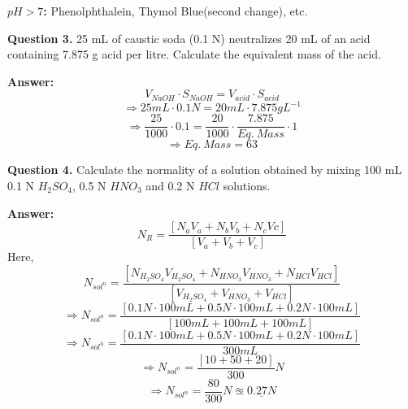 \documentclass[12pt]{article}
\begin{document}
	\textbf{$pH>7$: }Phenolphthalein, Thymol Blue(second change), etc.
	
	\pagebreak
	
	\textbf{Question 3.} 25 mL of caustic soda (0.1 N) neutralizes 20 mL of an acid containing 7.875 g acid per litre. Calculate the equivalent mass of the acid.
	
	\textbf{Answer: }\\
	$$V_{NaOH} \cdot S_{NaOH} = V_{acid} \cdot S_{acid}$$
	$$\Rightarrow 25mL \cdot 0.1N = 20mL \cdot 7.875gL^{-1}$$
	$$\Rightarrow \frac{25}{1000} \cdot 0.1 = \frac{20}{1000} \cdot \frac{7.875}{Eq.\ Mass} \cdot 1$$
	$$\Rightarrow Eq.\ Mass = 63$$
	
	\textbf{Question 4.} Calculate the normality of a solution obtained by mixing 100 mL 0.1 N $H_{2}SO_{4}$, 0.5 N $HNO_{3}$ and 0.2 N $HCl$ solutions.
	
	\textbf{Answer: }
	$$N_{R} = \frac{[N_{a}V_{a} + N_{b}V_{b} + N_{c}V{c}]}{[V_{a}+V_{b}+V_{c}]}$$
	Here,
	$$N_{sol^{\underline{n}}} = \frac{[N_{H_2SO_4}V_{H_2SO_4} + N_{HNO_3}V_{HNO_3} + N_{HCl}V_{HCl}]}{[V_{H_2SO_4}+V_{HNO_3}+V_{HCl}]}$$
	$$\Rightarrow N_{sol^{\underline{n}}} = \frac{[0.1N \cdot 100mL + 0.5N \cdot 100mL + 0.2N \cdot 100mL]}{[100mL+100mL+100mL]}$$
	$$\Rightarrow N_{sol^{\underline{n}}} = \frac{[0.1N \cdot 100mL + 0.5N \cdot 100mL + 0.2N \cdot 100mL]}{300mL}$$
	$$\Rightarrow N_{sol^{\underline{n}}} = \frac{[10 + 50 + 20]}{300}N$$
	$$\Rightarrow N_{sol^{\underline{n}}} = \frac{80}{300}N \approxeq \underline{0.27N}$$
	
	
	
	
\end{document}
